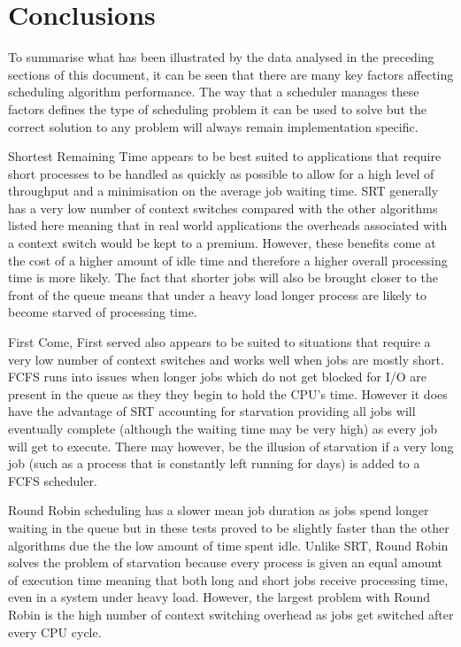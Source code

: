 \documentclass{acm_proc_article-sp}
\begin{document}
\section{Conclusions}
To summarise what has been illustrated by the data analysed in the preceding sections of this document, it can be seen that there are many key factors affecting scheduling algorithm performance. The way that a scheduler manages these factors defines the type of scheduling problem it can be used to solve but the correct solution to any problem will always remain implementation specific.

Shortest Remaining Time appears to be best suited to applications that require short processes to be handled as quickly as possible to allow for a high level of throughput and a minimisation on the average job waiting time. SRT generally has a very low number of context switches compared with the other algorithms listed here meaning that in real world applications the overheads associated with a context switch would be kept to a premium. However, these benefits come at the cost of a higher amount of idle time and therefore a higher overall processing time is more likely. The fact that shorter jobs will also be brought closer to the front of the queue means that under a heavy load longer process are likely to become starved of processing time.

First Come, First served also appears to be suited to situations that require a very low number of context switches and works well when jobs are mostly short. FCFS runs into issues when longer jobs which do not get blocked for I/O are present in the queue as they they begin to hold the CPU's time. However it does have the advantage of SRT accounting for starvation providing all jobs will eventually complete (although the waiting time may be very high) as every job will get to execute. There may however, be the illusion of starvation if a very long job (such as a process that is constantly left running for days) is added to a FCFS scheduler.

Round Robin scheduling has a slower mean job duration as jobs spend longer waiting in the queue but in these tests proved to be slightly faster than the other algorithms due the the low amount of time spent idle. Unlike SRT, Round Robin solves the problem of starvation because every process is given an equal amount of execution time meaning that both long and short jobs receive processing time, even in a system under heavy load. However, the largest problem with Round Robin is the high number of context switching overhead as jobs get switched after every CPU cycle.
\end{document}
